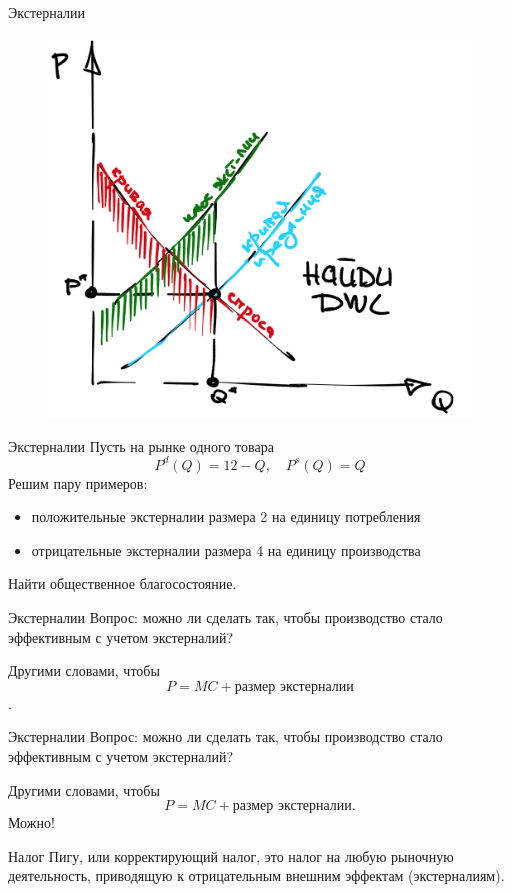 \documentclass{beamer}
\begin{document}
\begin{frame}{Экстерналии}
\begin{figure}[hbt]
\centering
\includegraphics[width=.8 \textwidth]{dwl.png}
\end{figure}
\end{frame}

\begin{frame}{Экстерналии}
Пусть на рынке одного товара
$$ P^d(Q) = 12 - Q, \quad P^s(Q) = Q$$
Решим пару примеров:
\begin{itemize}
  \item положительные экстерналии размера 2 на единицу потребления
  \item отрицательные экстерналии размера 4 на единицу производства
\end{itemize}
Найти общественное благосостояние.
\end{frame}

\begin{frame}{Экстерналии}
Вопрос: можно ли сделать так, чтобы производство стало эффективным с учетом экстерналий?

Другими словами, чтобы $$ P = MC + \text{размер экстерналии}$$.

\end{frame}

\begin{frame}{Экстерналии}
Вопрос: можно ли сделать так, чтобы производство стало эффективным с учетом экстерналий?

Другими словами, чтобы $$ P = MC + \text{размер экстерналии.}$$
Можно!

\alert{Налог Пигу}, или корректирующий налог, это налог на любую рыночную деятельность, приводящую к отрицательным внешним эффектам (экстерналиям).

\end{frame}
\end{document}
